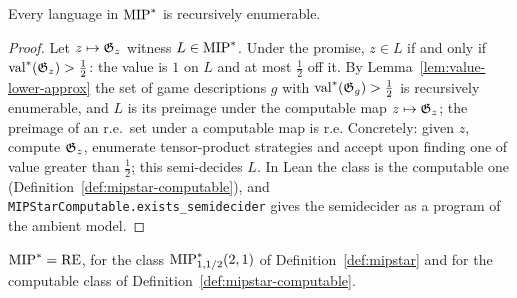 \begin{lemma}[$\MIPstar \subseteq \RE$]
\label{lem:mipstar-sub-re}
\leanok
Every language in $\mathrm{MIP}^*$ is recursively enumerable.
\end{lemma}

\begin{proof}
\leanok
Let $z \mapsto \mathfrak{G}_z$ witness $L \in \mathrm{MIP}^*$. Under the promise, $z \in L$ if and only
if $\mathrm{val}^*(\mathfrak{G}_z) > \frac12$: the value is $1$ on $L$ and at most $\frac12$ off it. By
Lemma~\ref{lem:value-lower-approx} the set of game descriptions $g$ with
$\mathrm{val}^*(\mathfrak{G}_g) > \frac12$ is recursively enumerable, and $L$ is its preimage under the
computable map $z \mapsto \mathfrak{G}_z$; the preimage of an r.e.\ set under a computable map is
r.e. Concretely: given $z$, compute $\mathfrak{G}_z$, enumerate tensor-product strategies and accept
upon finding one of value greater than $\frac12$; this semi-decides $L$. In Lean the class
is the computable one (Definition~\ref{def:mipstar-computable}), and
\texttt{MIPStarComputable.exists\_semidecider} gives the semidecider as a program of the ambient
model.
\end{proof}

\begin{theorem}[$\MIPstar = \RE$]
\label{thm:mipstar-eq-re}
\leanok
$\MIPstar = \RE$, for the class $\mathrm{MIP}^*_{1,1/2}(2,1)$ of Definition~\ref{def:mipstar} and
for the computable class of Definition~\ref{def:mipstar-computable}.
\end{theorem}

